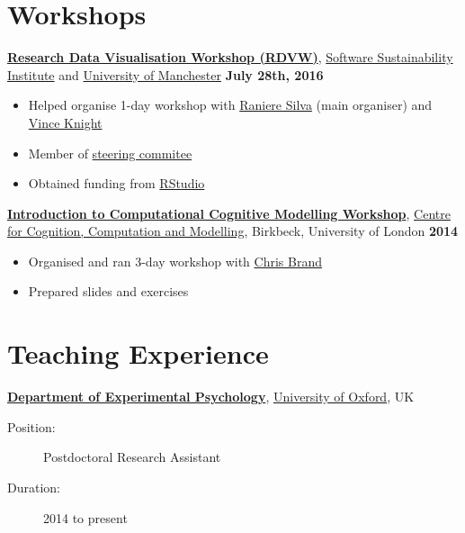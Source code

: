 \section{Workshops}

\href{http://www.software.ac.uk/rdvw/}{\textbf{Research Data Visualisation Workshop (RDVW)}}, \href{http://software.ac.uk/}{Software Sustainability Institute} and \href{http://www.manchester.ac.uk/}{University of Manchester} \hfill \textbf{July 28th, 2016}
\begin{itemize}
 \item Helped organise 1-day workshop with \href{http://www.software.ac.uk/about/people/raniere-silva}{Raniere Silva} (main organiser) and \href{http://www.cardiff.ac.uk/people/view/98654-knight-vincent}{Vince Knight}
 \item Member of \href{http://www.software.ac.uk/rdvw/committees}{steering commitee}
 \item Obtained funding from \href{https://www.rstudio.com/}{RStudio}
\end{itemize}

\href{https://sites.google.com/site/introcompcog/}{\textbf{Introduction to Computational Cognitive Modelling Workshop}}, \href{http://cccm.bbk.ac.uk/}{Centre for Cognition, Computation and Modelling}, Birkbeck, University of London
         \hfill \textbf{2014}
\begin{itemize}
 \item Organised and ran 3-day workshop with \href{https://www.researchgate.net/profile/Chris_Brand}{Chris Brand}
 \item Prepared slides and exercises 
\end{itemize}


\section{Teaching Experience}

\href{http://www.psy.ox.ac.uk/}{\textbf{Department of Experimental Psychology}}, \href{http://ox.ac.uk/}{University of Oxford}, UK
\begin{description}
 \item[Position:] Postdoctoral Research Assistant 
 \item[Duration:] 2014 to present 

\end{description}


